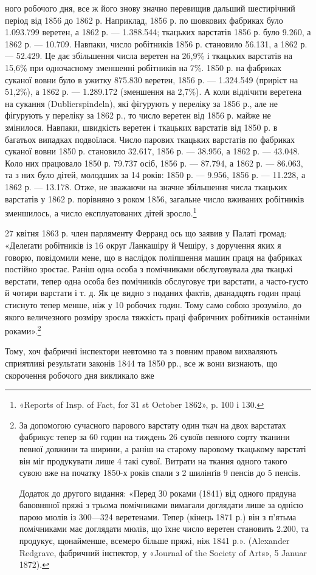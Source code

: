 ного робочого дня, все ж його знову значно перевищив дальший
шестирічний період від 1856 до 1862 р. Наприклад, 1856 р. по
шовкових фабриках було 1.093.799 веретен, а 1862 р. — 1.388.544;
ткацьких варстатів 1856 р. було 9.260, а 1862 р. — 10.709. Навпаки,
число робітників 1856 р. становило 56.131, а 1862 р. — 52.429.
Це дає збільшення числа веретен на 26,9\% і ткацьких варстатів
на 15,6\% при одночасному зменшенні робітників на 7\%. 1850 р. на
фабриках суканої вовни було в ужитку 875.830 веретен, 1856 р. —
1.324.549 (приріст на 51,2\%), а 1862 р. — 1.289.172 (зменшення
на 2,7\%). А коли відлічити веретена на сукання (Dublierspindeln),
які фігурують у переліку за 1856 р., але не фігурують у переліку
за 1862 р., то число веретен від 1856 р. майже не змінилося. Навпаки,
швидкість веретен і ткацьких варстатів від 1850 р. в
багатьох випадках подвоїлася. Число парових ткацьких варстатів
по фабриках суканої вовни 1850 р. становило 32.617,
1856 р. — 38.956, а 1862 р. — 43.048. Коло них працювало 1850 р.
79.737 осіб, 1856 р. — 87.794, а 1862 р. — 86.063, та з них було
дітей, молодших за 14 років: 1850 р. — 9.956, 1856 р. — 11.228,
а 1862 р. — 13.178. Отже, не зважаючи на значне збільшення
числа ткацьких варстатів у 1862 р. порівняно з роком 1856, загальне
число вживаних робітників зменшилось, а число експлуатованих
дітей зросло.\footnote{
«Reports of Insp. of Fact, for 31 st October 1862», p. 100 і 130.
}

27 квітня 1863 р. член парляменту Ферранд ось що заявив у
Палаті громад: «Делеґати робітників із 16 округ Ланкашіру й
Чешіру, з доручення яких я говорю, повідомили мене, що в наслідок
поліпшення машин праця на фабриках постійно зростає.
Раніш одна особа з помічниками обслуговувала два ткацькі верстати,
тепер одна особа без помічників обслуговує три варстати,
а часто-густо й чотири варстати і т. д. Як це видно з поданих
фактів, дванадцять годин праці стиснуто тепер менше, ніж у
10 робочих годин. Тому само собою зрозуміло, до якого величезного
розміру зросла тяжкість праці фабричних робітників останніми
роками».\footnote{
За допомогою сучасного парового варстату один ткач на двох
варстатах фабрикує тепер за 60 годин на тиждень 26 сувоїв певного сорту
тканини певної довжини та ширини, а раніш на старому паровому ткацькому
варстаті він міг продукувати лише 4 такі сувої. Витрати на ткання
одного такого сувою вже на початку 1850-х років спали з 2 шилінґів
9 пенсів до 5 пенсів.

Додаток до другого видання: «Перед З0 роками (1841) від одного прядуна
бавовняної пряжі з трьома помічниками вимагали доглядати лише
за однією парою мюлів із 300—324 веретенами. Тепер (кінець 1871 р.)
він з п’ятьма помічниками має доглядати мюлів, що їхнє число веретен
становить 2.200, та продукує, щонайменше, всемеро більше пряжі, ніж
1841 р.». (Alexander Redgrave, фабричний інспектор, у «Journal of
the Society of Arts», 5 Januar 1872).
}

Тому, хоч фабричні інспектори невтомно та з повним правом
вихваляють сприятливі результати законів 1844 та 1850 рр.,
все ж вони визнають, що скорочення робочого дня викликало вже